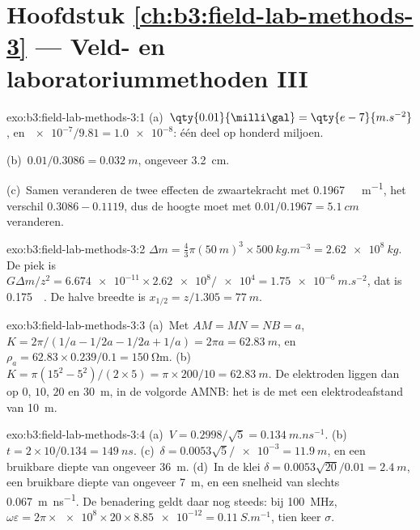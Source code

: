 \section*{Hoofdstuk \ref{ch:b3:field-lab-methods-3} --- Veld- en laboratoriummethoden III}

\begin{solution}{exo:b3:field-lab-methods-3:1}
(a)~$\qty{0.01}{\milli\gal} = \qty{e-7}{m.s^{-2}}$, en
$\num{e-7}/\num{9.81} = \num{1.0e-8}$: één deel op honderd miljoen.

(b)~$0.01/0.3086 = \qty{0.032}{m}$, ongeveer \qty{3.2}{cm}.

(c)~Samen veranderen de twee effecten de zwaartekracht met
\qty{0.1967}{\milli\gal.m^{-1}}, het verschil $0.3086 - 0.1119$, dus
de hoogte moet met $0.01/0.1967 = \qty{5.1}{cm}$ veranderen.
\end{solution}

\begin{solution}{exo:b3:field-lab-methods-3:2}
$\Delta m = \tfrac43\pi(\qty{50}{m})^3\times\qty{500}{kg.m^{-3}} =
\qty{2.62e8}{kg}$. De piek is $G\Delta m/z^2 =
\num{6.674e-11}\times\num{2.62e8}/\num{e4} = \qty{1.75e-6}{m.s^{-2}}$,
dat is \qty{0.175}{\milli\gal}. De halve breedte is $x_{1/2} = z/1.305 =
\qty{77}{m}$.
\end{solution}

\begin{solution}{exo:b3:field-lab-methods-3:3}
(a)~Met $AM = MN = NB = a$, $K = 2\pi/(1/a - 1/2a - 1/2a + 1/a) =
2\pi a = \qty{62.83}{m}$, en $\rho_a = 62.83\times0.239/0.1 =
\qty{150}{\ohm\metre}$. (b)~$K = \pi(15^2 - 5^2)/(2\times5) = \pi\times
200/10 = \qty{62.83}{m}$. De elektroden liggen dan op $0$, $10$, $20$
en \qty{30}{m}, in de volgorde AMNB: het is de 
met een elektrodeafstand van \qty{10}{m}.
\end{solution}

\begin{solution}{exo:b3:field-lab-methods-3:4}
(a)~$V = 0.2998/\sqrt5 = \qty{0.134}{m.ns^{-1}}$. (b)~$t =
2\times10/0.134 = \qty{149}{ns}$. (c)~$\delta = 0.0053\sqrt5/\num{e-3} =
\qty{11.9}{m}$, en een bruikbare diepte van ongeveer \qty{36}{m}. (d)~In de klei
$\delta = 0.0053\sqrt{20}/0.01 = \qty{2.4}{m}$, een bruikbare diepte van ongeveer
\qty{7}{m}, en een snelheid van slechts \qty{0.067}{m.ns^{-1}}. De
benadering geldt daar nog steeds: bij \qty{100}{MHz},
$\omega\varepsilon = 2\pi\times\num{e8}\times20\times\num{8.85e-12} =
\qty{0.11}{S.m^{-1}}$, tien keer $\sigma$.
\end{solution}

